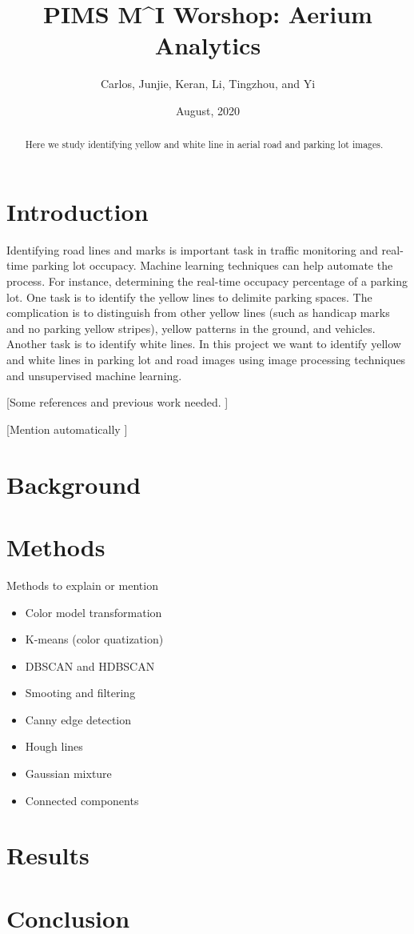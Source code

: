 \documentclass{article}
\author{Carlos, Junjie, Keran, Li, Tingzhou, and Yi}
\title{PIMS M\textasciicircum I Worshop: Aerium Analytics}
\date{August, 2020}
\begin{document}
\begin{abstract}
Here we study identifying yellow and white line in aerial road and parking lot images.
\end{abstract}


\maketitle

\section{Introduction}
Identifying road lines and marks is important task in traffic monitoring and real-time parking lot occupacy. Machine learning techniques can help automate the process. For instance, determining the real-time occupacy percentage of a parking lot. One task is to identify the yellow lines to delimite parking spaces. The complication is to distinguish from other yellow lines (such as handicap marks and no parking yellow stripes), yellow patterns in the ground, and vehicles. Another task is to identify white lines. In this project we want to identify yellow and white lines in parking lot and road images using image processing techniques and unsupervised machine learning.

[Some references and previous work needed. \citep{Lin2014}]

[Mention automatically ]


\section{Background}



\section{Methods}


Methods to explain or mention

\begin{itemize}
    \item Color model transformation
    \item K-means (color quatization)
    \item DBSCAN and HDBSCAN
    \item Smooting and filtering
    \item Canny edge detection
    \item Hough lines
    \item Gaussian mixture
    \item Connected components
\end{itemize}

\section{Results}


\section{Conclusion}




\end{document}
